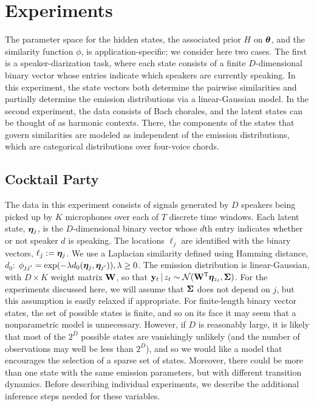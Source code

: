 \section{Experiments}
\label{sec:experiments}

The parameter space for the hidden states, the associated prior $H$ on
$\boldsymbol{\theta}$, and the similarity function
$\phi$, is application-specific; we consider here two cases.  The
first is a speaker-diarization task, where 
each state consists of a finite $D$-dimensional binary
vector whose entries indicate which speakers are currently
speaking.  In this experiment, the state vectors both determine
the pairwise similarities and partially determine the emission 
distributions via a linear-Gaussian model.
In the second experiment, the data consists of Bach chorales, and the
latent states can be thought of as harmonic contexts.  There, the components
of the states that govern similarities are modeled as 
independent of the emission distributions, which are categorical 
distributions over four-voice chords.

\subsection{Cocktail Party}
The data in this experiment consists of signals generated by $D$
speakers being picked up by $K$ microphones over each of $T$ discrete
time windows.  Each latent state, $\boldsymbol{\eta}_j$, is the $D$-dimensional
binary vector whose $d$th entry indicates whether or not speaker $d$ is
speaking.  The locations $\ell_j$ are identified with the binary
vectors, $\ell_j := \boldsymbol{\eta}_j$.  
We use a Laplacian similarity defined using Hamming distance, $d_0$:
$\phi_{jj'} = \exp(-\lambda d_{0}(\boldsymbol{\eta}_j,
\boldsymbol{\eta}_{j'})), \lambda \geq 0$.  The emission distribution is linear-Gaussian, with $D
\times K$ weight matrix $\mathbf{W}$, so that 
$\mathbf{y}_t \, \vert \, z_{t} \sim \mathcal{N}(\mathbf{W}^{\sf T} \boldsymbol{\eta}_{z_t},\boldsymbol{\Sigma})$.  
For the experiments discussed here, we will assume that $\boldsymbol{\Sigma}$ 
does not depend on $j$, but this assumption
is easily relaxed if appropriate.  For finite-length binary vector
states, the set of possible states is finite, and so on its face it may
seem that a nonparametric model is unnecessary.  However, if $D$ is
reasonably large, it is likely that most of the $2^D$ possible states
are vanishingly unlikely (and the number of observations may
well be less than $2^D$), and so we would like a model that encourages
the selection of a sparse set of states.  Moreover, there could be more
than one state with the same emission parameters, but with different transition
dynamics.  Before describing individual experiments, we describe the additional
inference steps needed for these variables.

